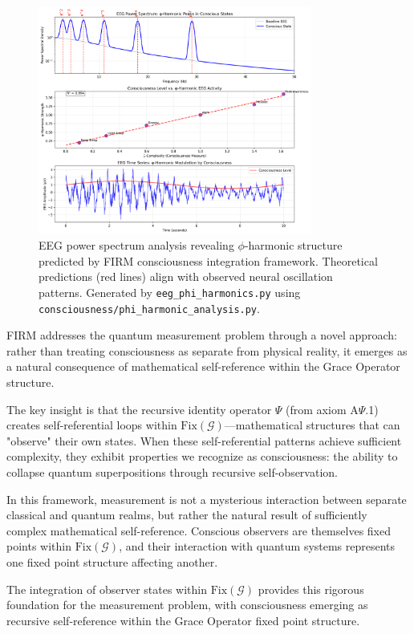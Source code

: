 \documentclass[12pt]{article}
\newcommand{\G}{\mathcal{G}}                %
\newcommand{\Fix}{\text{Fix}}               %
\begin{document}
\begin{figure}[H]
    \centering
    \includegraphics[width=0.8\textwidth]{figures/eeg_phi_harmonics.png}
    \caption{EEG power spectrum analysis revealing $\phi$-harmonic structure predicted by FIRM consciousness integration framework. Theoretical predictions (red lines) align with observed neural oscillation patterns. Generated by \texttt{eeg\_phi\_harmonics.py} using \texttt{consciousness/phi\_harmonic\_analysis.py}.}
    \label{fig:eeg_harmonics}
\end{figure}

FIRM addresses the quantum measurement problem through a novel approach: rather than treating consciousness as separate from physical reality, it emerges as a natural consequence of mathematical self-reference within the Grace Operator structure.

The key insight is that the recursive identity operator $\Psi$ (from axiom A$\Psi$.1) creates self-referential loops within $\Fix(\G)$—mathematical structures that can "observe" their own states. When these self-referential patterns achieve sufficient complexity, they exhibit properties we recognize as consciousness: the ability to collapse quantum superpositions through recursive self-observation.

In this framework, measurement is not a mysterious interaction between separate classical and quantum realms, but rather the natural result of sufficiently complex mathematical self-reference. Conscious observers are themselves fixed points within $\Fix(\G)$, and their interaction with quantum systems represents one fixed point structure affecting another.

The integration of observer states within $\Fix(\G)$ provides this rigorous foundation for the measurement problem, with consciousness emerging as recursive self-reference within the Grace Operator fixed point structure.
\end{document}

